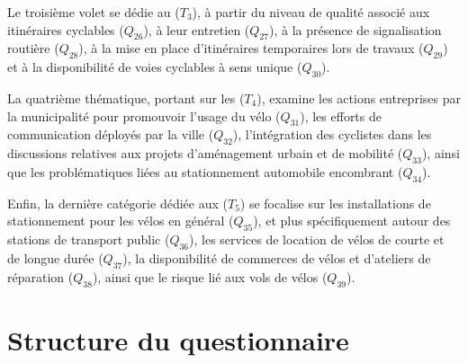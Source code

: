 Le troisième volet se dédie au  (\(T_{3}\)), à partir du niveau de qualité associé aux itinéraires cyclables (\(Q_{26}\)), à leur entretien (\(Q_{27}\)), à la présence de signalisation routière (\(Q_{28}\)), à la mise en place d'itinéraires temporaires lors de travaux (\(Q_{29}\)) et à la disponibilité de voies cyclables à sens unique (\(Q_{30}\)).

La quatrième thématique, portant sur les  (\(T_{4}\)), examine les actions entreprises par la municipalité pour promouvoir l'usage du vélo (\(Q_{31}\)), les efforts de communication déployés par la ville (\(Q_{32}\)), l'intégration des cyclistes dans les discussions relatives aux projets d'aménagement urbain et de mobilité (\(Q_{33}\)), ainsi que les problématiques liées au stationnement automobile encombrant (\(Q_{34}\)).

Enfin, la dernière catégorie dédiée aux  (\(T_{5}\)) se focalise sur les installations de stationnement pour les vélos en général (\(Q_{35}\)), et plus spécifiquement autour des stations de transport public (\(Q_{36}\)), les services de location de vélos de courte et de longue durée (\(Q_{37}\)), la disponibilité de commerces de vélos et d'ateliers de réparation (\(Q_{38}\)), ainsi que le risque lié aux vols de vélos (\(Q_{39}\)).%

    \newpage
\section{Structure du questionnaire}
    \label{annexes:structure-questionnaire-fub-tableau}

